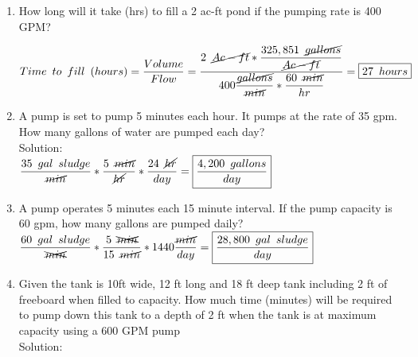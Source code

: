 \begin{enumerate}
\item How long will it take (hrs) to fill a 2 ac-ft pond if the pumping rate is 400 GPM?\\

 
 \vspace{0.2cm}
 
 $Time \enspace to \enspace fill \enspace(hours)= \dfrac{Volume}{Flow}=\dfrac{2 \enspace \cancel{Ac-ft}*\dfrac{325,851 \enspace \cancel{gallons}}{\cancel{Ac-ft}}}{400 \dfrac{\cancel{gallons}}{\cancel{min}}*\dfrac{60 \enspace\cancel{ min}}{hr}}=\boxed{27 \enspace hours}$\\
 
\item A pump is set to pump 5 minutes each hour. It pumps at the rate of 35 gpm. How many gallons of water are pumped each day?\\
Solution:\\
$\dfrac{35 \enspace gal \enspace sludge}{\cancel{min}}*\dfrac{5 \enspace \cancel{min}}{\cancel{hr}} *\dfrac{24 \enspace \cancel{hr}}{day}=\boxed{\dfrac{4,200 \enspace gallons}{day}}$\\
\vspace{0.5cm}

\item A pump operates 5 minutes each 15 minute interval.  If the pump capacity is 60 gpm, how many gallons are pumped daily?\\

$\dfrac{60 \enspace gal \enspace sludge}{\xcancel{min}}*\dfrac{5 \enspace \xcancel{min}}{15 \enspace \cancel{min}}*1440\dfrac{\cancel{min}}{day}=\boxed{\dfrac {28,800 \enspace gal \enspace sludge }{day}}$\\
\vspace{0.5cm}

\item Given the tank is 10ft wide, 12 ft long and 18 ft deep tank including 2 ft of freeboard when filled to capacity. How much time (minutes) will be required to pump down this tank to a depth of 2 ft when the tank is at maximum capacity using a 600 GPM pump\\
Solution:\\
\vspace{0.5cm}


\begin{tikzpicture}


\end{tikzpicture}
\end{enumerate}
